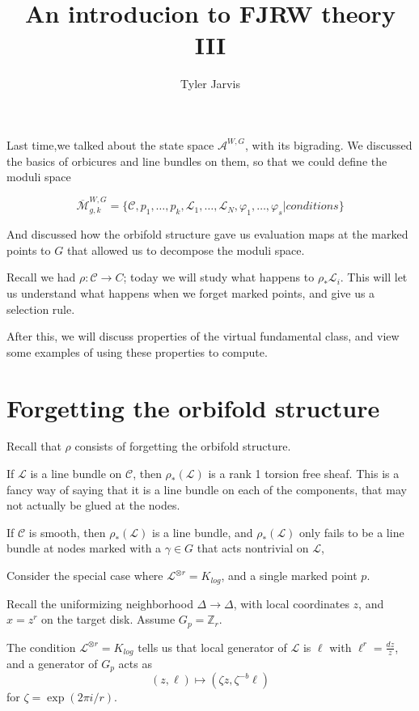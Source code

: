 \documentclass{amsart}
\title{An introducion to FJRW theory III}
\author{Tyler Jarvis}
\theoremstyle{definition}
\newcommand{\Z}{\mathbb{Z}}
\newcommand{\Mbar}{\overline{\mathcal{M}}}
\begin{document}
\maketitle
Last time,we talked about the state space $\mathcal{A}^{W,G}$, with its bigrading.  We discussed the basics of orbicures and line bundles on them, so that we could define the moduli space

$$\Mbar_{g,k}^{W,G}=\{\mathcal{C},p_1,\dots, p_k,\mathcal{L}_1,\dots,\mathcal{L}_N, \varphi_1,\dots, \varphi_s|conditions\}$$

And discussed how the orbifold structure gave us evaluation maps at the marked points to $G$ that allowed us to decompose the moduli space.

Recall we had $\rho:\mathcal{C}\to C$; today we will study what happens to $\rho_*\mathcal{L}_i$.    This will let us understand what happens when we forget marked points, and give us a selection rule.

After this, we will discuss properties of the virtual fundamental class, and view some examples of using these properties to compute.

\section{Forgetting the orbifold structure}
Recall that $\rho$ consists of forgetting the orbifold structure.

If $\mathcal{L}$ is a line bundle on $\mathcal{C}$, then $\rho_*(\mathcal{L})$ is a rank 1 torsion free sheaf.  This is a fancy way of saying that it is a line bundle on each of the components, that may not actually be glued at the nodes.

If $\mathcal{C}$ is smooth, then $\rho_*(\mathcal{L})$ is a line bundle, and 
$\rho_*(\mathcal{L})$ only fails to be a line bundle at nodes marked with a $\gamma\in G$ that acts nontrivial on $\mathcal{L}$,

Consider the special case where $\mathcal{L}^{\otimes r}=K_{log}$, and a single marked point $p$.

Recall the uniformizing neighborhood $\Delta\to \Delta$, with local coordinates $z$, and $x=z^r$ on the target disk.  Assume $G_p=\Z_r$.

The condition $\mathcal{L}^{\otimes r}=K_{log}$ tells us that local generator of $\mathcal{L}$ is $\ell$ with $\ell^r=\frac{dz}{z}$, and a generator of $G_p$ acts as
$$(z,\ell)\mapsto (\zeta z, \zeta^{-b} \ell)$$
for $\zeta=\exp(2\pi i/r)$.
\end{document}
